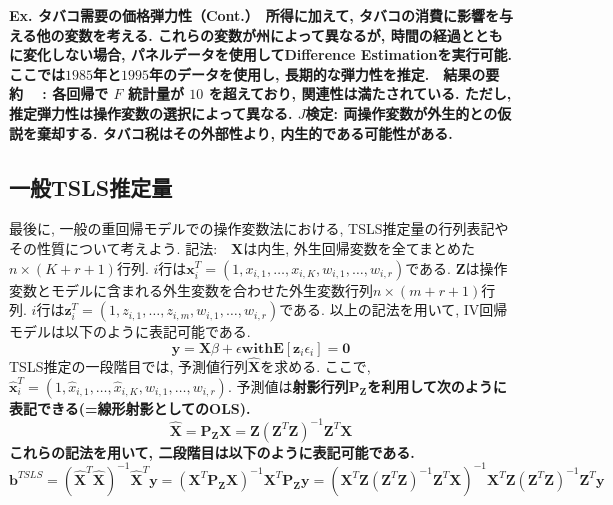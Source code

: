 \documentclass[paper=a4paper,fontsize=10pt]{jlreq}
\begin{document}
\rmfamily\mcfamily\bfseries{Ex. タバコ需要の価格弾力性（Cont.）}\mdseries　所得に加えて, タバコの消費に影響を与える他の変数を考える. これらの変数が州によって異なるが, 時間の経過とともに変化しない場合, \rmfamily\mcfamily\bfseries{パネルデータ}\mdseries を使用してDifference Estimationを実行可能. ここでは$1985$年と$1995$年のデータを使用し, 長期的な弾力性を推定.　\rmfamily\mcfamily\bfseries{結果の要約}\mdseries　 : 各回帰で $F$ 統計量が $10$ を超えており, 関連性は満たされている. ただし, 推定弾力性は操作変数の選択によって異なる. $J$検定: 両操作変数が外生的との仮説を棄却する. タバコ税はその外部性より, 内生的である可能性がある.\\

\subsection{一般TSLS推定量}
最後に, 一般の重回帰モデルでの操作変数法における, TSLS推定量の行列表記やその性質について考えよう. 記法:　$\mathbf{X}$は内生, 外生回帰変数を全てまとめた$n \times (K + r + 1)$行列. $i$行は$\mathbf{x}_i^T = (1, x_{i,1}, \dots, x_{i,K}, w_{i,1}, \dots, w_{i,r})$である. $\mathbf{Z}$は操作変数とモデルに含まれる外生変数を合わせた外生変数行列$n \times (m + r + 1)$行列. $i$行は$\mathbf{z}_i^T = (1, z_{i,1}, \dots, z_{i,m}, w_{i,1}, \dots, w_{i,r})$である. 以上の記法を用いて, IV回帰モデルは以下のように表記可能である.
\begin{equation*}
  \mathbf{y} = \mathbf{X}\beta + \epsilon　\mathbf{with}　\mathbf{E}[\mathbf{z}_i\epsilon_i] = \mathbf{0}
\end{equation*}
TSLS推定の一段階目では, 予測値行列$\hat{\mathbf{X}}$を求める. ここで, $\hat{\mathbf{x}}_i^T = (1, \hat{x}_{i,1}, \dots, \hat{x}_{i,K}, w_{i,1}, \dots, w_{i,r})$. 予測値は\rmfamily\mcfamily\bfseries{射影行列}\mdseries $\mathbf{P_Z}$を利用して次のように表記できる(=線形射影としてのOLS). 
\begin{equation*}
  \hat{\mathbf{X}} = \mathbf{P_Z}{\mathbf{X}} = \mathbf{Z}(\mathbf{Z}^T\mathbf{Z})^{-1}\mathbf{Z}^T\mathbf{X}
\end{equation*}
これらの記法を用いて, 二段階目は以下のように表記可能である.
\begin{equation*}
  \mathbf{b}^{TSLS} = (\hat{\mathbf{X}}^T\hat{\mathbf{X}})^{-1}\hat{\mathbf{X}}^T\mathbf{y} = (\mathbf{X}^T\mathbf{P_Z}{\mathbf{X}})^{-1}\mathbf{X}^T\mathbf{P_Z}\mathbf{y} = (\mathbf{X}^T\mathbf{Z}(\mathbf{Z}^T\mathbf{Z})^{-1}\mathbf{Z}^T\mathbf{X})^{-1}\mathbf{X}^T\mathbf{Z}(\mathbf{Z}^T\mathbf{Z})^{-1}\mathbf{Z}^T\mathbf{y}
\end{equation*}
\end{document}
